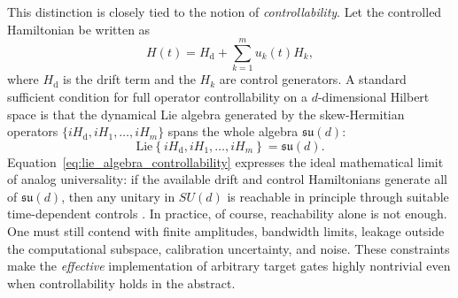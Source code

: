 This distinction is closely tied to the notion of \emph{controllability}. Let the controlled Hamiltonian be written as
\begin{equation}
H(t)
=
H_{\mathrm{d}}+\sum_{k=1}^{m} u_{k}(t)H_{k},
\label{eq:control_hamiltonian_section13}
\end{equation}
where $H_{\mathrm{d}}$ is the drift term and the $H_k$ are control generators. A standard sufficient condition for full operator controllability on a $d$-dimensional Hilbert space is that the dynamical Lie algebra generated by the skew-Hermitian operators $\{iH_{\mathrm{d}},iH_{1},\dots,iH_{m}\}$ spans the whole algebra $\mathfrak{su}(d)$:
\begin{equation}
\mathrm{Lie}\!\left\{ iH_{\mathrm{d}}, iH_{1}, \dots, iH_{m} \right\}
=
\mathfrak{su}(d).
\label{eq:lie_algebra_controllability}
\end{equation}
Equation~\eqref{eq:lie_algebra_controllability} expresses the ideal mathematical limit of analog universality: if the available drift and control Hamiltonians generate all of $\mathfrak{su}(d)$, then any unitary in $SU(d)$ is reachable in principle through suitable time-dependent controls \cite{DAlessandro2007}. In practice, of course, reachability alone is not enough. One must still contend with finite amplitudes, bandwidth limits, leakage outside the computational subspace, calibration uncertainty, and noise. These constraints make the \emph{effective} implementation of arbitrary target gates highly nontrivial even when controllability holds in the abstract.



